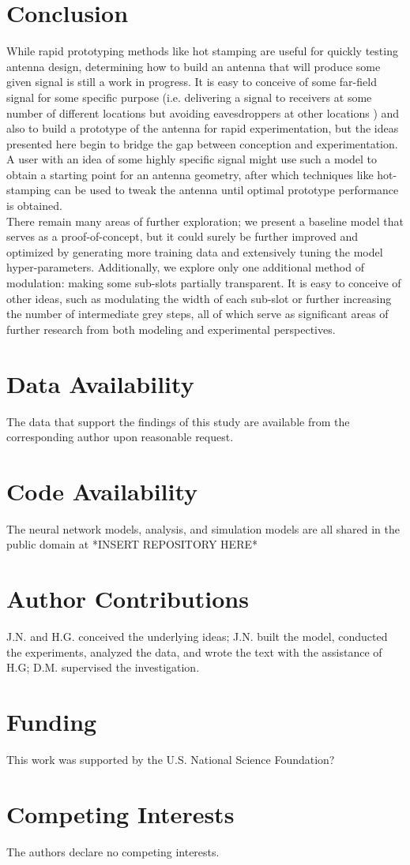 \documentclass[11pt]{article}
\begin{document}
\section*{Conclusion}

\noindent While rapid prototyping methods like hot stamping are useful for quickly testing antenna design, determining how to build an antenna that will produce some given signal is still a work in progress. It is easy to conceive of some far-field signal for some specific purpose (i.e. delivering a signal to receivers at some number of different locations but avoiding eavesdroppers at other locations	) and also to build a prototype of the antenna for rapid experimentation, but the ideas presented here begin to bridge the gap between conception and experimentation. A user with an idea of some highly specific signal might use such a model to obtain a starting point for an antenna geometry, after which techniques like hot-stamping can be used to tweak the antenna until optimal prototype performance is obtained. \\

\noindent There remain many areas of further exploration; we present a baseline model that serves as a proof-of-concept, but it could surely be further improved and optimized by generating more training data and extensively tuning the model hyper-parameters. Additionally, we explore only one additional method of modulation: making some sub-slots partially transparent. It is easy to conceive of other ideas, such as modulating the width of each sub-slot or further increasing the number of intermediate grey steps, all of which serve as significant areas of further research from both modeling and experimental perspectives.

\section*{Data Availability}
The data that support the findings of this study are available from the corresponding author upon reasonable request.

\section*{Code Availability}
The neural network models, analysis, and simulation models are all shared in the public domain at *INSERT REPOSITORY HERE*

\section*{Author Contributions}
J.N. and H.G. conceived the underlying ideas; J.N. built the model, conducted the experiments, analyzed the data, and wrote the text with the assistance of H.G; D.M. supervised the investigation.

\section*{Funding}
This work was supported by the U.S. National Science Foundation?

\section*{Competing Interests}
The authors declare no competing interests. 



\end{document}
